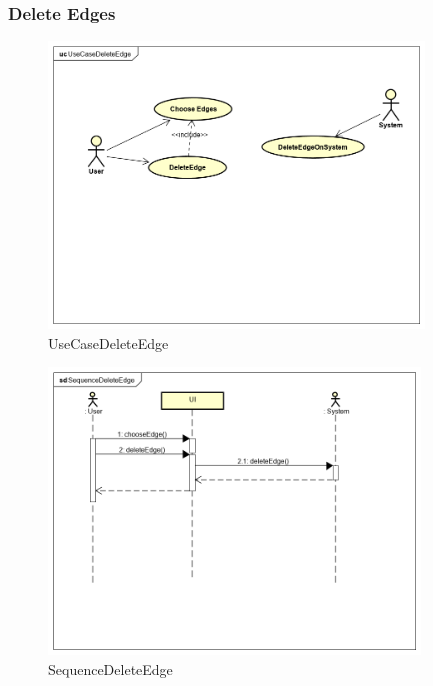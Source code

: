\documentclass[a4paper,10pt]{article}
\begin{document}
\subsubsection{Delete Edges}
\begin{figure}[H]
		\centering
		\includegraphics[height = 3in]{UseCaseDeleteEdge.png}
		\caption[Optional caption]{UseCaseDeleteEdge}
		\label{fig:UseCaseDeleteEdge}
	\end{figure}
	
	\begin{figure}[H]
		\centering
		\includegraphics[height = 3in]{SequenceDeleteEdge.png}
		\caption[Optional caption]{SequenceDeleteEdge}
		\label{fig:SequenceDeleteEdge}
	\end{figure}
	
\end{document}
